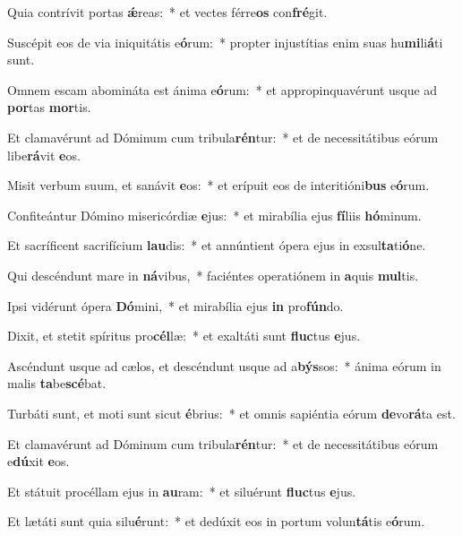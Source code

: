 \item Quia contrívit portas \textbf{ǽ}reas:~* et vectes férre\textbf{os} con\textbf{fré}git.
\item Suscépit eos de via iniquitátis e\textbf{ó}rum:~* propter injustítias enim suas hu\textbf{mi}li\textbf{á}ti sunt.
\item Omnem escam abomináta est ánima e\textbf{ó}rum:~* et appropinquavérunt usque ad \textbf{por}tas \textbf{mor}tis.
\item Et clamavérunt ad Dóminum cum tribula\textbf{rén}tur:~* et de necessitátibus eórum libe\textbf{rá}vit \textbf{e}os.
\item Misit verbum suum, et sanávit \textbf{e}os:~* et erípuit eos de interitióni\textbf{bus} e\textbf{ó}rum.
\item Confiteántur Dómino misericórdiæ \textbf{e}jus:~* et mirabília ejus \textbf{fí}liis \textbf{hó}minum.
\item Et sacríficent sacrifícium \textbf{lau}dis:~* et annúntient ópera ejus in exsul\textbf{ta}ti\textbf{ó}ne.
\item Qui descéndunt mare in \textbf{ná}vibus,~* faciéntes operatiónem in \textbf{a}quis \textbf{mul}tis.
\item Ipsi vidérunt ópera \textbf{Dó}mini,~* et mirabília ejus \textbf{in} pro\textbf{fún}do.
\item Dixit, et stetit spíritus pro\textbf{cél}læ:~* et exaltáti sunt \textbf{fluc}tus \textbf{e}jus.
\item Ascéndunt usque ad cælos, et descéndunt usque ad a\textbf{býs}sos:~* ánima eórum in malis \textbf{ta}be\textbf{scé}bat.
\item Turbáti sunt, et moti sunt sicut \textbf{é}brius:~* et omnis sapiéntia eórum \textbf{de}vo\textbf{rá}ta est.
\item Et clamavérunt ad Dóminum cum tribula\textbf{rén}tur:~* et de necessitátibus eórum e\textbf{dú}xit \textbf{e}os.
\item Et státuit procéllam ejus in \textbf{au}ram:~* et siluérunt \textbf{fluc}tus \textbf{e}jus.
\item Et lætáti sunt quia silu\textbf{é}runt:~* et dedúxit eos in portum volun\textbf{tá}tis e\textbf{ó}rum.
